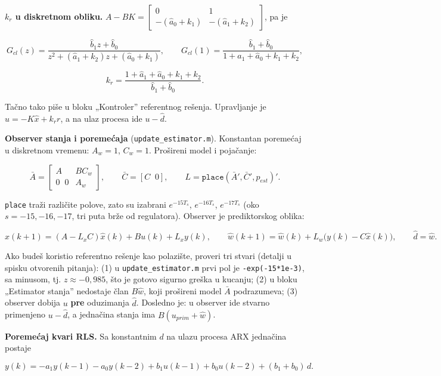 \documentclass[11pt,a4paper,parskip=half,headsepline,numbers=noenddot]{scrartcl}
\begin{document}
\textbf{\(k_r\) u diskretnom obliku.} \(A - BK = \begin{bmatrix}0 & 1\\ -(\hat a_0 + k_1) & -(\hat a_1 + k_2)\end{bmatrix}\), pa je

\[G_{cl}(z) = \frac{\hat b_1z + \hat b_0}{z^2 + (\hat a_1 + k_2)z + (\hat a_0 + k_1)},\qquad G_{cl}(1) = \frac{\hat b_1 + \hat b_0}{1 + \hat a_1 + \hat a_0 + k_1 + k_2},\]

\[k_r = \frac{1 + \hat a_1 + \hat a_0 + k_1 + k_2}{\hat b_1 + \hat b_0} .\]

Tačno tako piše u bloku „Kontroler'' referentnog rešenja. Upravljanje je \(u = -K\hat x + k_rr\), a na ulaz procesa ide \(u - \hat d\).

\textbf{Observer stanja i poremećaja} (\texttt{update\_\allowbreak{}estimator.m}). Konstantan poremećaj u diskretnom vremenu: \(A_w = 1\), \(C_w = 1\). Prošireni model i pojačanje:

\[\bar A = \begin{bmatrix}A & BC_w\\ 0\;\;0 & A_w\end{bmatrix},\qquad \bar C = [C\;\; 0],\qquad L = \texttt{place}(\bar A', \bar C', p_{est})' .\]

\texttt{place} traži različite polove, zato su izabrani \(e^{-15T_s}\), \(e^{-16T_s}\), \(e^{-17T_s}\) (oko \(s = -15, -16, -17\), tri puta brže od regulatora). Observer je prediktorskog oblika:

\[\hat x(k+1) = (A - L_xC)\hat x(k) + Bu(k) + L_xy(k),\qquad \hat w(k+1) = \hat w(k) + L_w\big(y(k) - C\hat x(k)\big),\qquad \hat d = \hat w .\]

\begin{ispit}
Ako budeš koristio referentno rešenje kao polazište, proveri tri stvari (detalji u spisku otvorenih pitanja): (1) u \texttt{update\_\allowbreak{}estimator.m} prvi pol je \texttt{-exp(\allowbreak{}-15*1e-3)}, sa minusom, tj. \(z \approx -0{,}985\), što je gotovo sigurno greška u kucanju; (2) u bloku „Estimator stanja'' nedostaje član \(B\hat w\), koji prošireni model \(\bar A\) podrazumeva; (3) observer dobija \(u\) \textbf{pre} oduzimanja \(\hat d\). Dosledno je: u observer ide stvarno primenjeno \(u - \hat d\), a jednačina stanja ima \(B(u_{prim} + \hat w)\).
\end{ispit}

\textbf{Poremećaj kvari RLS.} Sa konstantnim \(d\) na ulazu procesa ARX jednačina postaje

\[y(k) = -a_1y(k-1) - a_0y(k-2) + b_1u(k-1) + b_0u(k-2) + (b_1 + b_0)\,d .\]
\end{document}
